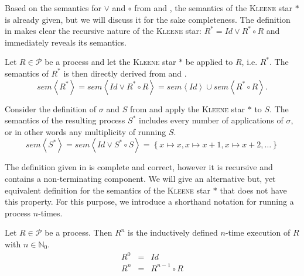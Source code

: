 Based on the semantics for $\vee$ and $\circ$ from  and , the semantics of the \textsc{Kleene} star $*$ is already given, but we will discuss it for the sake completeness. The definition in  makes clear the recursive nature of the \textsc{Kleene} star: $R^* = Id \vee R^* \circ R$ and immediately reveals its semantics.
\begin{definition}
\label{def:sem_kleene}
Let $R \in \mathcal{P}$ be a process and let the \textsc{Kleene} star $*$ be applied to $R$, i.e. $R^*$. The semantics of $R^*$ is then directly derived from  and .
  \begin{equation}
    \label{eqn:sem_kleene}
    sem \left\langle R^* \right\rangle = sem \left\langle Id \vee R^* \circ R \right\rangle = sem \left\langle Id \right\rangle \cup sem \left\langle R^* \circ R \right\rangle.
  \end{equation}
  \hfill\qedsymbol
\end{definition}

\begin{example}
Consider the definition of $\sigma$ and $S$ from  and apply the \textsc{Kleene} star $*$ to $S$. The semantics of the resulting process $S^*$ includes every number of applications of $\sigma$, or in other words any multiplicity of running $S$.
  \begin{equation}
    sem \left\langle S^* \right\rangle = sem \left\langle Id \vee S^* \circ S \right\rangle = \left\{ x \mapsto x, x \mapsto x+1, x \mapsto x+2, \ldots \right\}
  \end{equation}
  \hfill\qedsymbol
\end{example}

The definition given in  is complete and correct, however it is recursive and contains a non-terminating component. We will give an alternative but, yet equivalent definition for the semantics of the \textsc{Kleene} star $*$ that does not have this property. For this purpose, we introduce a shorthand notation for running a process $n$-times.
\begin{definition}
\label{def:multiple_execution}
Let $R \in \mathcal{P}$ be a process. Then $R^n$ is the inductively defined $n$-time execution of $R$ with $n \in \mathbb{N}_0$.
  \begin{eqnarray}
    \label{eqn:multiple_execution}
    R^0 & = & Id \\
    R^n & = & R^{n-1} \circ R 
  \end{eqnarray}
  \hfill\qedsymbol
\end{definition}

